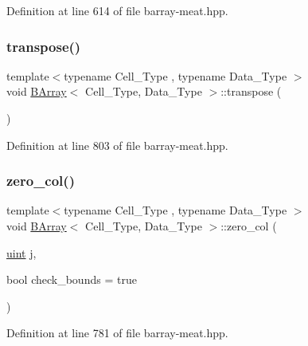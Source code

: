 Definition at line 614 of file barray-\/meat.\+hpp.

\mbox{\label{group__barray-insert_ga0284f7f2148b7c1b474ebe01f6548b98}} 
\subsubsection{\texorpdfstring{transpose()}{transpose()}}
{\footnotesize\ttfamily template$<$typename Cell\+\_\+\+Type , typename Data\+\_\+\+Type $>$ \\
void \hyperlink{class_b_array}{B\+Array}$<$ Cell\+\_\+\+Type, Data\+\_\+\+Type $>$\+::transpose (\begin{DoxyParamCaption}{ }\end{DoxyParamCaption})\hspace{0.3cm}{\ttfamily [inline]}}



Definition at line 803 of file barray-\/meat.\+hpp.

\mbox{\label{group__barray-insert_ga0fa473027d00ec53ed08eaea03ac3ef7}} 
\subsubsection{\texorpdfstring{zero\+\_\+col()}{zero\_col()}}
{\footnotesize\ttfamily template$<$typename Cell\+\_\+\+Type , typename Data\+\_\+\+Type $>$ \\
void \hyperlink{class_b_array}{B\+Array}$<$ Cell\+\_\+\+Type, Data\+\_\+\+Type $>$\+::zero\+\_\+col (\begin{DoxyParamCaption}\item[{\hyperlink{typedefs_8hpp_a91ad9478d81a7aaf2593e8d9c3d06a14}{uint}}]{j,  }\item[{bool}]{check\+\_\+bounds = {\ttfamily true} }\end{DoxyParamCaption})\hspace{0.3cm}{\ttfamily [inline]}}



Definition at line 781 of file barray-\/meat.\+hpp.

\mbox{\label{group__barray-insert_ga411085fcb7530669c72d9847340f1bac}} 

